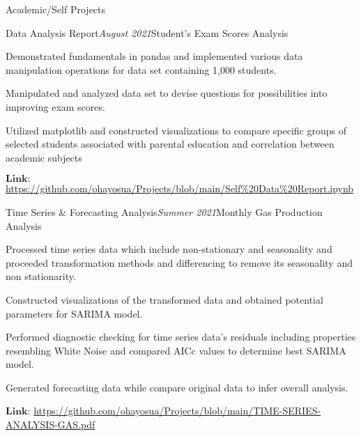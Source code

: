 \documentclass{resume} %
\begin{document}
\begin{rSection}{Academic/Self Projects}


\begin{rSubsection}{Data Analysis Report}{\em August 2021}{Student's Exam Scores Analysis}{}
\item Demonstrated fundamentals in pandas and implemented various data manipulation operations for data set containing 1,000 students.
\item Manipulated and analyzed data set to devise questions for possibilities into improving exam scores.
\item Utilized matplotlib and constructed visualizations to compare specific groups of selected students associated with parental education and correlation between academic subjects
\item $\textbf{Link:}$
\url{https://github.com/ohayosua/Projects/blob/main/Self\%20Data\%20Report.ipynb}
\end{rSubsection}


\begin{rSubsection}{Time Series $\textbf{\&}$ Forecasting Analysis}{\em Summer 2021}{Monthly Gas Production Analysis}{}
\item Processed time series data which include non-stationary and seasonality and proceeded transformation methods and differencing to remove its seasonality and non stationarity. 
\item Constructed visualizations of the transformed data and obtained potential parameters for SARIMA model.
\item Performed diagnostic checking for time series data's residuals including properties resembling White Noise and compared AICc values to determine best SARIMA model.
\item Generated forecasting data while compare original data to infer overall analysis. 
\item $\textbf{Link:}$ \url{https://github.com/ohayosua/Projects/blob/main/TIME-SERIES-ANALYSIS-GAS.pdf}
\end{rSubsection}

\end{rSection}



\end{document}
